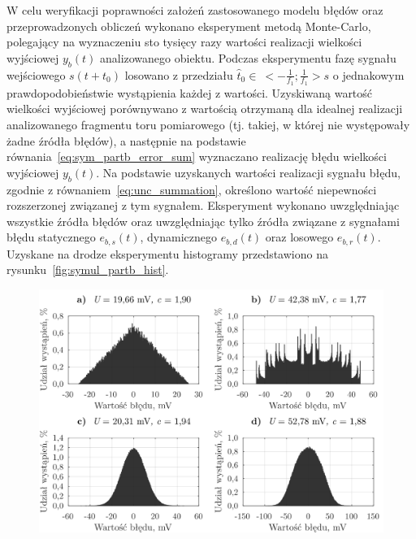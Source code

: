 W celu weryfikacji poprawności założeń zastosowanego modelu błędów oraz przeprowadzonych obliczeń wykonano eksperyment metodą Monte-Carlo, polegający na wyznaczeniu sto tysięcy razy wartości realizacji wielkości wyjściowej $y_{b}(t)$ analizowanego obiektu. Podczas eksperymentu fazę sygnału wejściowego $s(t+t_{0})$ losowano z przedziału $\hat{t}_{0} \in~<-\frac{1}{f_{1}};\frac{1}{f_{1}}>\unit{s}$ o jednakowym prawdopodobieństwie wystąpienia każdej z wartości. Uzyskiwaną wartość wielkości wyjściowej porównywano z wartością otrzymaną dla idealnej realizacji analizowanego fragmentu toru pomiarowego (tj. takiej, w której nie występowały żadne źródła błędów), a następnie na podstawie równania~\eqref{eq:sym_partb_error_sum} wyznaczano realizację błędu wielkości wyjściowej $y_{b}(t)$. Na podstawie uzyskanych wartości realizacji sygnału błędu, zgodnie z równaniem~\eqref{eq:unc_summation}, określono wartość niepewności rozszerzonej związanej z tym sygnałem. Eksperyment wykonano uwzględniając wszystkie źródła błędów oraz uwzględniając tylko źródła związane z sygnałami błędu statycznego $e_{b,s}(t)$, dynamicznego $e_{b,d}(t)$ oraz losowego $e_{b,r}(t)$. Uzyskane na drodze eksperymentu histogramy przedstawiono na rysunku~\ref{fig:symul_partb_hist}.

\begin{figure}[htb!]
\begin{center}
\includegraphics{obrazki/hist_part_b}
\end{center}
\end{figure}

